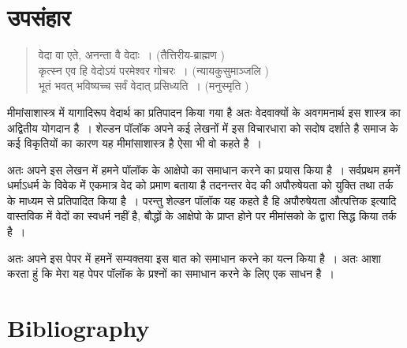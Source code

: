 \section*{उपसंहार}

\vskip 15pt

\begin{verse}
वेदा वा एते, अनन्ता वै वेदाः~। (तैत्तिरीय-ब्राह्मण )\\कृत्स्न एव हि वेदोऽयं परमेश्वर गोचरः~। (न्यायकुसुमाञ्जलि )\\भूतं भवत् भविष्यच्च सर्वं वेदात् प्रसिध्यति~। (मनुस्मृति )
\end{verse}

\vskip 6pt

मीमांसाशास्त्र में यागादिरूप वेदार्थ का प्रतिपादन किया गया है अतः वेदवाक्यों के अवगमनार्थ इस शास्त्र का अद्वितीय योगदान है~। शेल्डन पॉलॉक अपने कई लेखनों में इस विचारधारा को सदोष दर्शाते है समाज के कई विकृतियों का कारण यह मीमांसाशास्त्र है ऐसा भी वो कहते है~।

अतः अपने इस लेखन में हमने पॉलॉक के आक्षेपो का समाधान करने का प्रयास किया है~। सर्वप्रथम हमनें धर्माऽधर्म के विवेक में एकमात्र वेद को प्रमाण बताया है तदनन्तर वेद की अपौरुषेयता को युक्ति तथा तर्क के माध्यम से प्रतिपादित किया है~। परन्तु शेल्डन पॉलॉक यह कहते है हि अपौरुषेयता औत्पत्तिक इत्यादि वास्तविक में वेदों का स्वधर्म नहीं है, बौद्धों के आक्षेपो के प्राप्त होने पर मीमांसको के द्वारा सिद्ध किया तर्क है~। 

अतः अपने इस पेपर में हमनें सम्यक्तया इस बात को समाधान करने का यत्न किया है~। अतः आशा करता हुं कि मेरा यह पेपर पॉलॉक के प्रश्नों का समाधान करने के लिए एक साधन है~।


\bgroup

\selecteng

\section*{Bibliography}

\retainauthsanskrit

